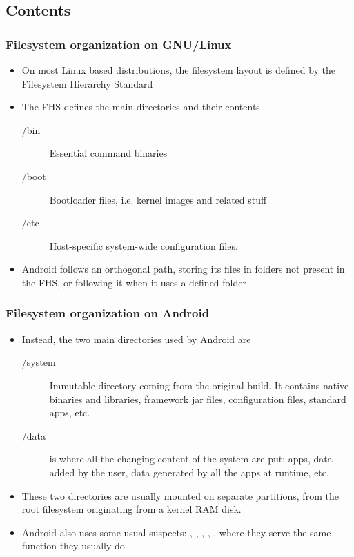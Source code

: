 \subsection{Contents}
\begin{frame}
  \frametitle{Filesystem organization on GNU/Linux}
  \begin{itemize}
  \item On most Linux based distributions, the filesystem layout is
    defined by the Filesystem Hierarchy Standard
  \item The FHS defines the main directories and their contents
    \begin{description}
    \item[/bin] Essential command binaries
    \item[/boot] Bootloader files, i.e. kernel images and related stuff
    \item[/etc] Host-specific system-wide configuration files.
    \end{description}
  \item Android follows an orthogonal path, storing its files in
    folders not present in the FHS, or following it when it uses a
    defined folder
  \end{itemize}
\end{frame}

\begin{frame}
  \frametitle{Filesystem organization on Android}
  \begin{itemize}
  \item Instead, the two main directories used by Android are
    \begin{description}
    \item[/system] Immutable directory coming from the original
      build. It contains native binaries and libraries, framework jar
      files, configuration files, standard apps,  etc.
    \item[/data] is where all the changing content of the system are put:
      apps, data added by the user, data generated by all the apps at
      runtime, etc.
    \end{description}
  \item These two directories are usually mounted on separate
    partitions, from the root filesystem originating from a kernel
    RAM disk.
  \item Android also uses some usual suspects: ,
    , , , , 
    where they serve the same function they usually do
  \end{itemize}
\end{frame}

